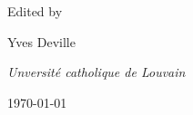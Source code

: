 \begin{titlepage}
	
	Edited by
	
	\vspace{0.5\baselineskip} %
	
	{\Large Yves Deville \\} %
	
	\vspace{0.5\baselineskip} %
	
	\textit{Unversité catholique de Louvain}
	
	\vspace{0.5\baselineskip} 
	
	

	\vfill %
	
	
  	\today 
    \vspace{0.3\baselineskip} %

	\doclicenseThis
	

\end{titlepage}



